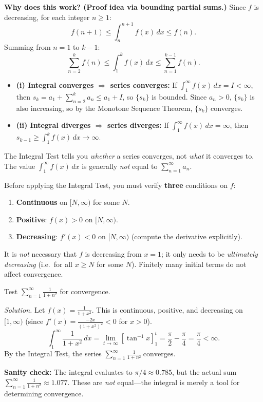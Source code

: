 \noindent
\textbf{Why does this work? (Proof idea via bounding partial sums.)}
Since $f$ is decreasing, for each integer $n\ge 1$:
\[
f(n+1)\le \int_n^{n+1}f(x)\,dx\le f(n).
\]
Summing from $n=1$ to $k-1$:
\[
\sum_{n=2}^{k}f(n)\le \int_1^{k}f(x)\,dx\le \sum_{n=1}^{k-1}f(n).
\]
\begin{itemize}[leftmargin=*]
\item \textbf{(i) Integral converges $\Rightarrow$ series converges:}
If $\int_1^{\infty}f(x)\,dx=I<\infty$, then $s_k=a_1+\sum_{n=2}^{k}a_n\le a_1+I$, so $\{s_k\}$ is bounded.
Since $a_n>0$, $\{s_k\}$ is also increasing, so by the Monotone Sequence Theorem, $\{s_k\}$ converges.
\item \textbf{(ii) Integral diverges $\Rightarrow$ series diverges:}
If $\int_1^{\infty}f(x)\,dx=\infty$, then $s_{k-1}\ge \int_1^{k}f(x)\,dx\to\infty$.
\end{itemize}

\begin{commonmistake}[title={Common Mistake: The Integral Test does NOT give the sum}]
The Integral Test tells you \emph{whether} a series converges, not \emph{what} it converges to.
The value $\int_1^{\infty}f(x)\,dx$ is generally \emph{not} equal to $\sum_{n=1}^{\infty}a_n$.
\end{commonmistake}

\begin{examtip}[title={Exam Focus: Integral Test checklist}]
Before applying the Integral Test, you must verify \textbf{three} conditions on $f$:
\begin{enumerate}[leftmargin=3em]
\item \textbf{Continuous} on $[N,\infty)$ for some $N$.
\item \textbf{Positive}: $f(x)>0$ on $[N,\infty)$.
\item \textbf{Decreasing}: $f'(x)<0$ on $[N,\infty)$ (compute the derivative explicitly).
\end{enumerate}
It is \emph{not} necessary that $f$ is decreasing from $x=1$; it only needs to be \emph{ultimately decreasing} (i.e.\ for all $x\ge N$ for some $N$). Finitely many initial terms do not affect convergence.
\end{examtip}

\begin{examplebox}[title={Worked Example (Lecture Example 5.1): $\sum \frac{1}{1+n^2}$ converges}]
Test $\displaystyle\sum_{n=1}^{\infty}\frac{1}{1+n^2}$ for convergence.

\emph{Solution.}
Let $f(x)=\frac{1}{1+x^2}$. This is continuous, positive, and decreasing on $[1,\infty)$ (since $f'(x)=\frac{-2x}{(1+x^2)^2}<0$ for $x>0$).
\[
\int_1^{\infty}\frac{1}{1+x^2}\,dx
=\lim_{t\to\infty}\left[\tan^{-1}x\right]_1^{t}
=\frac{\pi}{2}-\frac{\pi}{4}=\frac{\pi}{4}<\infty.
\]
By the Integral Test, the series $\displaystyle\boxed{\sum_{n=1}^{\infty}\frac{1}{1+n^2}\ \text{converges}}$.

\textbf{Sanity check:} The integral evaluates to $\pi/4\approx 0.785$, but the actual sum $\sum_{n=1}^{\infty}\frac{1}{1+n^2}\approx 1.077$. These are \emph{not} equal---the integral is merely a tool for determining convergence.
\end{examplebox}

